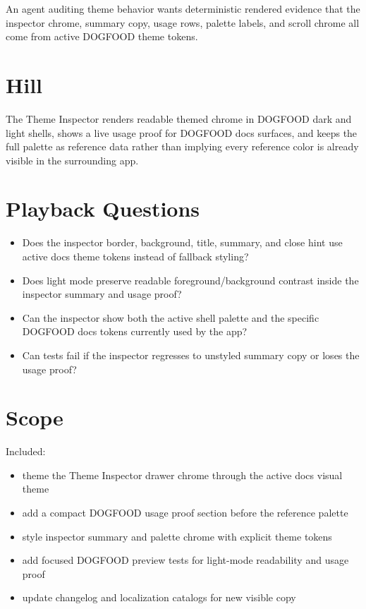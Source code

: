 An agent auditing theme behavior wants deterministic rendered evidence that the inspector chrome, summary copy, usage rows, palette labels, and scroll chrome all come from active DOGFOOD theme tokens.

\section{Hill}\label{record-186-hill}

The Theme Inspector renders readable themed chrome in DOGFOOD dark and light shells, shows a live usage proof for DOGFOOD docs surfaces, and keeps the full palette as reference data rather than implying every reference color is already visible in the surrounding app.

\section{Playback Questions}\label{record-186-playback-questions}

\begin{itemize}
\tightlist
\item
  Does the inspector border, background, title, summary, and close hint use active docs theme tokens instead of fallback styling?
\item
  Does light mode preserve readable foreground/background contrast inside the inspector summary and usage proof?
\item
  Can the inspector show both the active shell palette and the specific DOGFOOD docs tokens currently used by the app?
\item
  Can tests fail if the inspector regresses to unstyled summary copy or loses the usage proof?
\end{itemize}

\section{Scope}\label{record-186-scope}

Included:

\begin{itemize}
\tightlist
\item
  theme the Theme Inspector drawer chrome through the active docs visual theme
\item
  add a compact DOGFOOD usage proof section before the reference palette
\item
  style inspector summary and palette chrome with explicit theme tokens
\item
  add focused DOGFOOD preview tests for light-mode readability and usage proof
\item
  update changelog and localization catalogs for new visible copy
\end{itemize}

